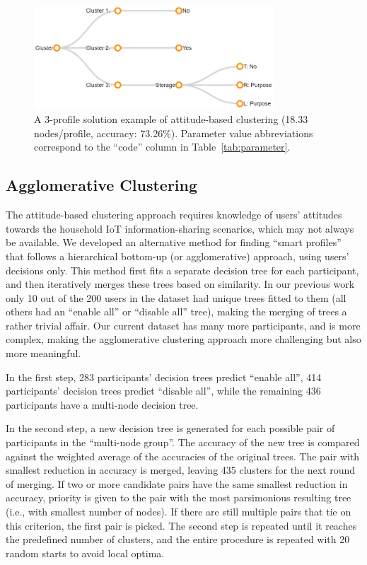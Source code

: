 \begin{figure}
	\centering
	\includegraphics[width=0.8\textwidth]{figures/attitude_3_profile.png}
	\caption{A 3-profile solution example of attitude-based clustering (18.33 nodes/profile, accuracy: 73.26\%). Parameter value abbreviations correspond to the ``code'' column in Table~\ref{tab:parameter}.}
	\label{fig:attitude_3profile}
\end{figure}

\subsection{Agglomerative Clustering}
The attitude-based clustering approach requires knowledge of users' attitudes towards the household IoT information-sharing scenarios, which may not always be available. We developed an alternative method for finding ``smart profiles'' that follows a hierarchical bottom-up (or agglomerative) approach, using users' decisions only. This method first fits a separate decision tree for each participant, and then iteratively merges these trees based on similarity. In our previous work~\cite{bahiratiui2018} only 10 out of the 200 users in the dataset had unique trees fitted to them (all others had an ``enable all'' or ``disable all'' tree), making the merging of trees a rather trivial affair. Our current dataset has many more participants, and is more complex, making the agglomerative clustering approach more challenging but also more meaningful. 

In the first step, 283 participants' decision trees predict ``enable all'', 414 participants' decision trees predict ``disable all'', while the remaining 436 participants have a multi-node decision tree.

In the second step, a new decision tree is generated for each possible pair of participants in the ``multi-node group''. The accuracy of the new tree is compared against the weighted average of the accuracies of the original trees. The pair with smallest reduction in accuracy is merged, leaving 435 clusters for the next round of merging. If two or more candidate pairs have the same smallest reduction in accuracy, priority is given to the pair with the most parsimonious resulting tree (i.e., with smallest number of nodes). If there are still multiple pairs that tie on this criterion, the first pair is picked. The second step is repeated until it reaches the predefined number of clusters, and the entire procedure is repeated with 20 random starts to avoid local optima.

